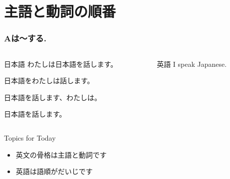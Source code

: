 \documentclass[aspectratio=169,xcolor={dvipsnames,table}]{beamer}
\begin{document}
\section{主語と動詞の順番}
\begin{frame}[plain]\frametitle{Aは〜する.}

\begin{columns}
\begin{column}[t]{.45\textwidth}
\begin{block}{日本語}
わたしは日本語を話します。\pause

日本語をわたしは話します。\pause

日本語を話します、わたしは。\pause

日本語を話します。
\end{block}
\end{column}
\pause
\begin{column}[t]{.45\textwidth}
\begin{block}{英語}
I speak Japanese.
\end{block}
\end{column}
\end{columns}


\bigskip
\pause
\begin{exampleblock}{Topics for Today}
\begin{itemize}
 \item   英文の骨格は主語と動詞です
 \item   英語は語順がだいじです
\end{itemize}
     \end{exampleblock}
\end{frame}
\end{document}
